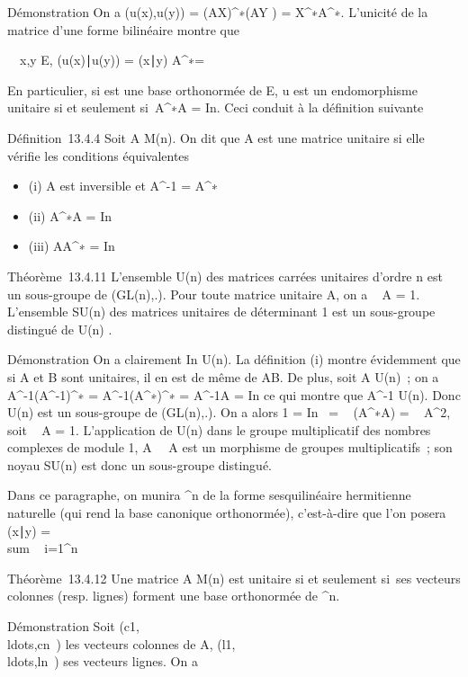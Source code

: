 Démonstration On a \phi(u(x),u(y)) = (AX)^∗\Omega(AY ) =
X^∗A^∗\OmegaAY . L'unicité de la matrice d'une forme
bilinéaire montre que

\forall~~x,y \in E,
(u(x)∣u(y)) =
(x∣y) \mathrel\Leftrightarrow
A^∗\OmegaA = \Omega

En particulier, si  est une base orthonormée de E, u est un
endomorphisme unitaire si et seulement si~A^∗A =
In. Ceci conduit à la définition suivante

Définition~13.4.4 Soit A \in M(n). On dit que A est une matrice
unitaire si elle vérifie les conditions équivalentes

\begin{itemize}
\itemsep1pt\parskip0pt
\item
  (i) A est inversible et A^-1 = A^∗
\item
  (ii) A^∗A = In
\item
  (iii) AA^∗ = In
\end{itemize}

Théorème~13.4.11 L'ensemble U(n) des matrices carrées unitaires d'ordre
n est un sous-groupe de (GL(n),.). Pour toute matrice
unitaire A, on a
\textbar{}~
A\textbar{} = 1. L'ensemble SU(n) des matrices unitaires de déterminant
1 est un sous-groupe distingué de U(n) .

Démonstration On a clairement In \in U(n). La définition (i)
montre évidemment que si A et B sont unitaires, il en est de même de AB.
De plus, soit A \in U(n)~; on a
A^-1(A^-1)^∗ =
A^-1(A^∗)^∗ = A^-1A =
In ce qui montre que A^-1 \in U(n). Donc U(n) est un
sous-groupe de (GL(n),.). On a alors 1
=  In~
= ~
(A^∗A) =
\textbar{}~
A\textbar{}^2, soit
\textbar{}~
A\textbar{} = 1. L'application de U(n) dans le groupe multiplicatif des
nombres complexes de module 1,
A\mapsto~~
A est un morphisme de groupes multiplicatifs~; son noyau SU(n) est donc
un sous-groupe distingué.

Dans ce paragraphe, on munira ^n de la forme sesquilinéaire
hermitienne naturelle (qui rend la base canonique orthonormée),
c'est-à-dire que l'on posera (x∣y)
= \\sum ~
i=1^n\overlinexiyi

Théorème~13.4.12 Une matrice A \in M(n) est unitaire si et
seulement si~ses vecteurs colonnes (resp. lignes) forment une base
orthonormée de ^n.

Démonstration Soit
(c1,\\ldots,cn~)
les vecteurs colonnes de A,
(l1,\\ldots,ln~)
ses vecteurs lignes. On a

